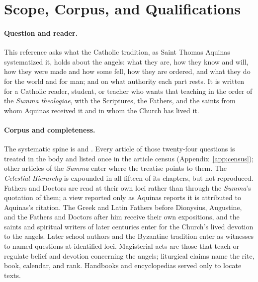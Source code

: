 \section{Scope, Corpus, and Qualifications}\label{app:scope}

\paragraph{Question and reader.} This reference asks what the Catholic
tradition, as Saint Thomas Aquinas systematized it, holds about the angels:
what they are, how they know and will, how they were made and how some fell,
how they are ordered, and what they do for the world and for man; and on what
authority each part rests. It is written for a Catholic reader, student, or
teacher who wants that teaching in the order of the \emph{Summa theologiae},
with the Scriptures, the Fathers, and the saints from whom Aquinas received
it and in whom the Church has lived it.

\paragraph{Corpus and completeness.} The systematic spine is 
and . Every article of those twenty-four questions is
treated in the body and listed once in the article census
(Appendix~\ref{app:census}); other articles of the \emph{Summa} enter where
the treatise points to them. The \emph{Celestial Hierarchy} is expounded in
all fifteen of its chapters, but not reproduced. Fathers and Doctors are
read at their own loci rather than through the \emph{Summa}'s quotation of
them; a view reported only as Aquinas reports it is attributed to Aquinas's
citation. The Greek and Latin Fathers before Dionysius, Augustine, and the
Fathers and Doctors after him receive their own expositions, and the saints
and spiritual writers of later centuries enter for the Church's lived
devotion to the angels. Later school authors and the Byzantine tradition enter as witnesses
to named questions at identified loci. Magisterial acts are those that teach
or regulate belief and devotion concerning the angels; liturgical claims name
the rite, book, calendar, and rank. Handbooks and encyclopedias served only
to locate texts.

